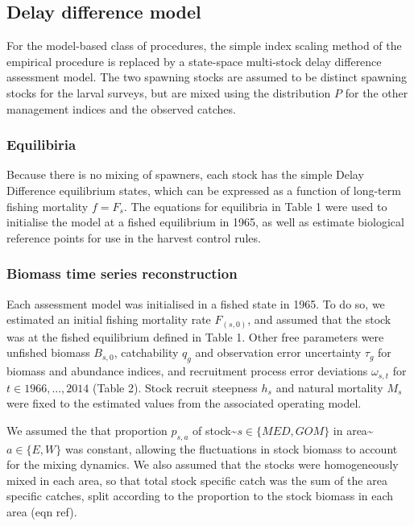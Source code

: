 \documentclass[]{article}
\begin{document}
\hypertarget{delay-difference-model}{%
\subsection{Delay difference model}\label{delay-difference-model}}

For the model-based class of procedures, the simple index scaling
method of the empirical procedure is replaced by a state-space
multi-stock delay difference assessment model. The two spawning
stocks are assumed to be distinct spawning stocks for the larval
surveys, but are mixed using the distribution \(P\) for
the other management indices and the observed catches.

\hypertarget{equilibiria}{%
\subsubsection{Equilibiria}\label{equilibiria}}

Because there is no mixing of spawners, each stock has the simple Delay
Difference equilibrium states, which can be expressed as a function
of long-term fishing mortality \(f = F_s\). The equations for equilibria
in Table 1 were used to initialise the model at a fished equilibrium
in 1965, as well as estimate biological reference points for use in
the harvest control rules.

\hypertarget{biomass-time-series-reconstruction}{%
\subsubsection{Biomass time series reconstruction}\label{biomass-time-series-reconstruction}}

Each assessment model was initialised in a fished state in 1965. To do so,
we estimated an initial fishing mortality rate \(F_(s,0)\), and assumed
that the stock was at the fished equilibrium defined in Table 1. Other free
parameters were unfished biomass \(B_{s,0}\), catchability \(q_g\) and
observation error uncertainty \(\tau_g\) for biomass and abundance indices,
and recruitment process error deviations \(\omega_{s,t}\) for
\(t \in 1966,..., 2014\) (Table 2). Stock recruit steepness \(h_s\)
and natural mortality \(M_s\) were fixed to the estimated values from
the associated operating model.

We assumed the that proportion \(p_{s,a}\) of
stock\textasciitilde{}\(s \in \{MED,GOM\}\) in area\textasciitilde{}\(a \in \{E,W\}\) was
constant, allowing the fluctuations in stock biomass to
account for the mixing dynamics. We also assumed that the stocks
were homogeneously mixed in each area, so that total stock specific
catch was the sum of the area specific catches, split according
to the proportion to the stock biomass in each area (eqn ref).
\end{document}
